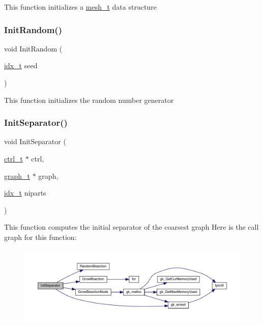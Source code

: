 This function initializes a \hyperlink{a00738}{mesh\+\_\+t} data structure \mbox{\label{a00945_af2c57b66ac078298d06e3c1413416215}} 
\subsubsection{\texorpdfstring{Init\+Random()}{InitRandom()}}
{\footnotesize\ttfamily void Init\+Random (\begin{DoxyParamCaption}\item[{\hyperlink{a00876_aaa5262be3e700770163401acb0150f52}{idx\+\_\+t}}]{seed }\end{DoxyParamCaption})}

This function initializes the random number generator \mbox{\label{a00945_a2927ed69df973d68e918bb74f75b0b70}} 
\subsubsection{\texorpdfstring{Init\+Separator()}{InitSeparator()}}
{\footnotesize\ttfamily void Init\+Separator (\begin{DoxyParamCaption}\item[{\hyperlink{a00742}{ctrl\+\_\+t} $\ast$}]{ctrl,  }\item[{\hyperlink{a00734}{graph\+\_\+t} $\ast$}]{graph,  }\item[{\hyperlink{a00876_aaa5262be3e700770163401acb0150f52}{idx\+\_\+t}}]{niparts }\end{DoxyParamCaption})}

This function computes the initial separator of the coarsest graph Here is the call graph for this function\+:\nopagebreak
\begin{figure}[H]
\begin{center}
\leavevmode
\includegraphics[width=350pt]{a00945_a2927ed69df973d68e918bb74f75b0b70_cgraph}
\end{center}
\end{figure}
\mbox{\label{a00945_a0c897af52fe5815caadbe6a13f2f9f54}} 
